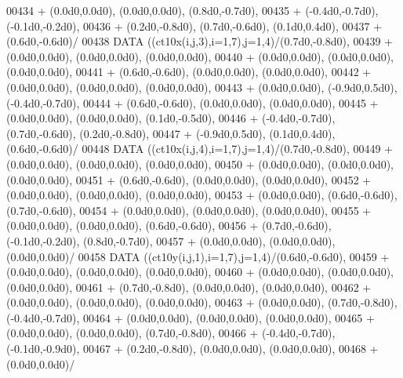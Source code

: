 \begin{DoxyCode}
00434      +                  (0.0d0,0.0d0), (0.0d0,0.0d0), (0.8d0,-0.7d0),
00435      +                  (-0.4d0,-0.7d0), (-0.1d0,-0.2d0),
00436      +                  (0.2d0,-0.8d0), (0.7d0,-0.6d0), (0.1d0,0.4d0),
00437      +                  (0.6d0,-0.6d0)/
00438       \textcolor{keyword}{DATA}              ((ct10x(i,j,3),i=1,7),j=1,4)/(0.7d0,-0.8d0),
00439      +                  (0.0d0,0.0d0), (0.0d0,0.0d0), (0.0d0,0.0d0),
00440      +                  (0.0d0,0.0d0), (0.0d0,0.0d0), (0.0d0,0.0d0),
00441      +                  (0.6d0,-0.6d0), (0.0d0,0.0d0), (0.0d0,0.0d0),
00442      +                  (0.0d0,0.0d0), (0.0d0,0.0d0), (0.0d0,0.0d0),
00443      +                  (0.0d0,0.0d0), (-0.9d0,0.5d0), (-0.4d0,-0.7d0),
00444      +                  (0.6d0,-0.6d0), (0.0d0,0.0d0), (0.0d0,0.0d0),
00445      +                  (0.0d0,0.0d0), (0.0d0,0.0d0), (0.1d0,-0.5d0),
00446      +                  (-0.4d0,-0.7d0), (0.7d0,-0.6d0), (0.2d0,-0.8d0),
00447      +                  (-0.9d0,0.5d0), (0.1d0,0.4d0), (0.6d0,-0.6d0)/
00448       \textcolor{keyword}{DATA}              ((ct10x(i,j,4),i=1,7),j=1,4)/(0.7d0,-0.8d0),
00449      +                  (0.0d0,0.0d0), (0.0d0,0.0d0), (0.0d0,0.0d0),
00450      +                  (0.0d0,0.0d0), (0.0d0,0.0d0), (0.0d0,0.0d0),
00451      +                  (0.6d0,-0.6d0), (0.0d0,0.0d0), (0.0d0,0.0d0),
00452      +                  (0.0d0,0.0d0), (0.0d0,0.0d0), (0.0d0,0.0d0),
00453      +                  (0.0d0,0.0d0), (0.6d0,-0.6d0), (0.7d0,-0.6d0),
00454      +                  (0.0d0,0.0d0), (0.0d0,0.0d0), (0.0d0,0.0d0),
00455      +                  (0.0d0,0.0d0), (0.0d0,0.0d0), (0.6d0,-0.6d0),
00456      +                  (0.7d0,-0.6d0), (-0.1d0,-0.2d0), (0.8d0,-0.7d0),
00457      +                  (0.0d0,0.0d0), (0.0d0,0.0d0), (0.0d0,0.0d0)/
00458       \textcolor{keyword}{DATA}              ((ct10y(i,j,1),i=1,7),j=1,4)/(0.6d0,-0.6d0),
00459      +                  (0.0d0,0.0d0), (0.0d0,0.0d0), (0.0d0,0.0d0),
00460      +                  (0.0d0,0.0d0), (0.0d0,0.0d0), (0.0d0,0.0d0),
00461      +                  (0.7d0,-0.8d0), (0.0d0,0.0d0), (0.0d0,0.0d0),
00462      +                  (0.0d0,0.0d0), (0.0d0,0.0d0), (0.0d0,0.0d0),
00463      +                  (0.0d0,0.0d0), (0.7d0,-0.8d0), (-0.4d0,-0.7d0),
00464      +                  (0.0d0,0.0d0), (0.0d0,0.0d0), (0.0d0,0.0d0),
00465      +                  (0.0d0,0.0d0), (0.0d0,0.0d0), (0.7d0,-0.8d0),
00466      +                  (-0.4d0,-0.7d0), (-0.1d0,-0.9d0),
00467      +                  (0.2d0,-0.8d0), (0.0d0,0.0d0), (0.0d0,0.0d0),
00468      +                  (0.0d0,0.0d0)/

\end{DoxyCode}
